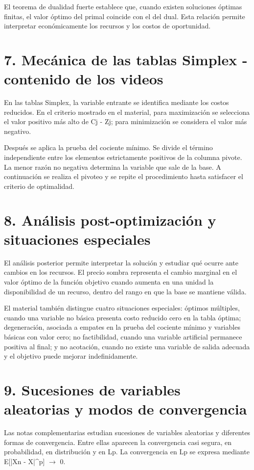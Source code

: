 \documentclass[11pt]{article}
\begin{document}
El teorema de dualidad fuerte establece que, cuando existen soluciones óptimas finitas, el valor óptimo del primal coincide con el del dual. Esta relación permite interpretar económicamente los recursos y los costos de oportunidad.


\section*{7. Mecánica de las tablas Simplex - contenido de los videos}
En las tablas Simplex, la variable entrante se identifica mediante los costos reducidos. En el criterio mostrado en el material, para maximización se selecciona el valor positivo más alto de Cj - Zj; para minimización se considera el valor más negativo.

Después se aplica la prueba del cociente mínimo. Se divide el término independiente entre los elementos estrictamente positivos de la columna pivote. La menor razón no negativa determina la variable que sale de la base. A continuación se realiza el pivoteo y se repite el procedimiento hasta satisfacer el criterio de optimalidad.


\section*{8. Análisis post-optimización y situaciones especiales}
El análisis posterior permite interpretar la solución y estudiar qué ocurre ante cambios en los recursos. El precio sombra representa el cambio marginal en el valor óptimo de la función objetivo cuando aumenta en una unidad la disponibilidad de un recurso, dentro del rango en que la base se mantiene válida.

El material también distingue cuatro situaciones especiales: óptimos múltiples, cuando una variable no básica presenta costo reducido cero en la tabla óptima; degeneración, asociada a empates en la prueba del cociente mínimo y variables básicas con valor cero; no factibilidad, cuando una variable artificial permanece positiva al final; y no acotación, cuando no existe una variable de salida adecuada y el objetivo puede mejorar indefinidamente.


\section*{9. Sucesiones de variables aleatorias y modos de convergencia}
Las notas complementarias estudian sucesiones de variables aleatorias y diferentes formas de convergencia. Entre ellas aparecen la convergencia casi segura, en probabilidad, en distribución y en Lp. La convergencia en Lp se expresa mediante E[|Xn - X|^p] \(\to\) 0.
\end{document}

